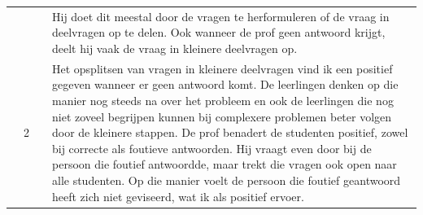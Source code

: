 \documentclass[a4paper,12pt,twoside]{article}%
\begin{document}
\begin{landscape}
		
		\begin{tabularx}{1.56\textwidth}{|Q{0.25\textwidth}|Q{0.1\textwidth}|Q{0.25\textwidth}|Q{0.85\textwidth}|}
			& & & Hij doet dit meestal door de vragen te herformuleren of de vraag in deelvragen op te delen. Ook wanneer de prof geen antwoord krijgt, deelt hij vaak de vraag in kleinere deelvragen op.  \\
			& 2 & & Het opsplitsen van vragen in kleinere deelvragen vind ik een positief gegeven wanneer er geen antwoord komt. De leerlingen denken op die manier nog steeds na over het probleem en ook de leerlingen die nog niet zoveel begrijpen kunnen  bij complexere problemen beter volgen door de kleinere stappen. De prof benadert de studenten positief, zowel bij correcte als foutieve antwoorden. Hij vraagt even door bij de persoon die foutief antwoordde, maar trekt die vragen ook open naar alle studenten. Op die manier voelt de persoon die foutief geantwoord heeft zich niet geviseerd, wat ik als positief ervoer. \\\hline
		\end{tabularx}
		
	\end{landscape}



\end{document}
